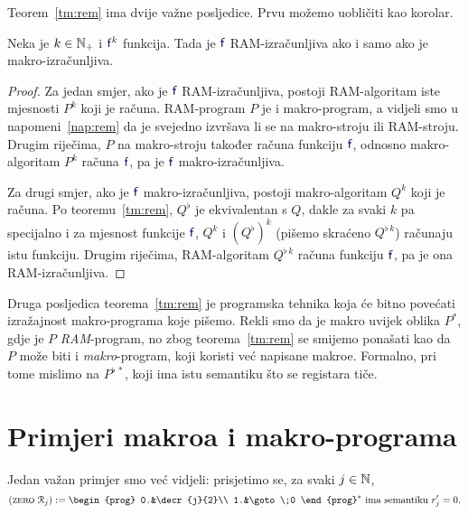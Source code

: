 Teorem~\ref{tm:rem} ima dvije važne posljedice. Prvu možemo uobličiti kao korolar.

\begin{korolar}\label{kor:rem}
Neka je $k\in{\mathbb N}_+$ i $\f f^k$ funkcija. Tada je $\f f$ RAM-izračunljiva ako i samo ako je makro-izračunljiva.
\end{korolar}
\begin{proof}
Za jedan smjer, ako je $\f f$ RAM-izračunljiva, postoji RAM-algoritam iste mjesnosti $P^k$ koji je računa.  RAM-program $P$ je i makro-program, a vidjeli smo u napomeni~\ref{nap:rem} da je svejedno izvršava li se na makro-stroju ili RAM-stroju. Drugim riječima, $P$ na makro-stroju također računa funkciju $\f f$, odnosno makro-algoritam $P^k$ računa $\f f$, pa je $\f f$ makro-izračunljiva.

Za drugi smjer, ako je $\f f$ makro-izračunljiva, postoji makro-algoritam $Q^k$ koji je računa. Po teoremu~\ref{tm:rem}, $Q^\flat$ je ekvivalentan s $Q$, dakle za svaki $k$ pa specijalno i za mjesnost funkcije $\f f$, $Q^k$ i $(Q^\flat)^k$ (pišemo skraćeno $Q^{\flat\,k}$) računaju istu funkciju. Drugim riječima, RAM-algoritam $Q^{\flat\,k}$ računa funkciju $\f f$, pa je ona RAM-izračunljiva.
\end{proof}

\begin{napomena}
Druga posljedica teorema~\ref{tm:rem} je programska tehnika koja će bitno povećati izražajnost makro-programa koje pišemo. Rekli smo da je makro uvijek oblika $P^*$, gdje je $P$ \emph{RAM}-program, no zbog teorema~\ref{tm:rem} se smijemo ponašati kao da $P$ može biti i \emph{makro}-program, koji koristi već napisane makroe. Formalno, pri tome mislimo na $P^{\flat\,*}$, koji ima istu semantiku što se registara tiče.
\end{napomena}

\section{Primjeri makroa i makro-programa}

Jedan važan primjer smo već vidjeli: prisjetimo se, za svaki $j\in{\mathbb N}$,
\begin{equation}
(\textsc{zero}\;\reg{j}):=\begin{prog}
0.&\decr{j}{2}\\
1.&\goto\;0
\end{prog}^*\text{
 ima semantiku $r_j'=0$.}
\end{equation}

